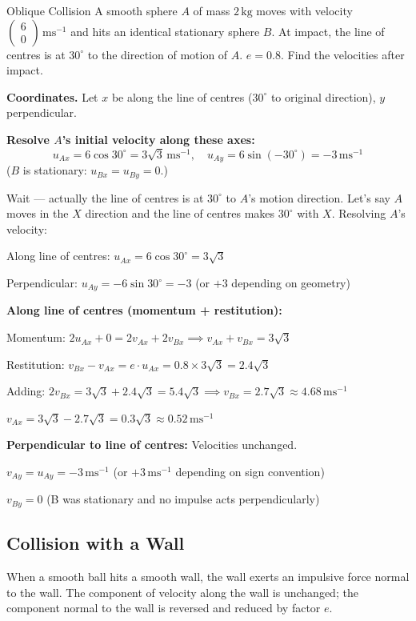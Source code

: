 \documentclass[12pt, a4paper]{book}
\newcommand{\ms}{\,\mathrm{ms}^{-1}}
\newcommand{\kg}{\,\mathrm{kg}}
\begin{document}
\begin{exmp}{Oblique Collision}{}
A smooth sphere $A$ of mass $2\kg$ moves with velocity $\begin{pmatrix}6 \\ 0\end{pmatrix}\ms$ and hits an identical stationary sphere $B$. At impact, the line of centres is at $30^\circ$ to the direction of motion of $A$. $e = 0.8$. Find the velocities after impact.

\medskip
\textbf{Coordinates.} Let $x$ be along the line of centres ($30^\circ$ to original direction), $y$ perpendicular.

\textbf{Resolve $A$'s initial velocity along these axes:}
\[
  u_{Ax} = 6\cos 30^\circ = 3\sqrt{3}\ms, \quad u_{Ay} = 6\sin(-30^\circ) = -3\ms
\]
($B$ is stationary: $u_{Bx} = u_{By} = 0$.)

Wait --- actually the line of centres is at $30^\circ$ to $A$'s motion direction. Let's say $A$ moves in the $X$ direction and the line of centres makes $30^\circ$ with $X$. Resolving $A$'s velocity:

Along line of centres: $u_{Ax} = 6\cos 30^\circ = 3\sqrt{3}$

Perpendicular: $u_{Ay} = -6\sin 30^\circ = -3$ (or $+3$ depending on geometry)

\textbf{Along line of centres (momentum + restitution):}

Momentum: $2u_{Ax} + 0 = 2v_{Ax} + 2v_{Bx} \implies v_{Ax} + v_{Bx} = 3\sqrt{3}$

Restitution: $v_{Bx} - v_{Ax} = e \cdot u_{Ax} = 0.8 \times 3\sqrt{3} = 2.4\sqrt{3}$

Adding: $2v_{Bx} = 3\sqrt{3} + 2.4\sqrt{3} = 5.4\sqrt{3} \implies v_{Bx} = 2.7\sqrt{3} \approx 4.68\ms$

$v_{Ax} = 3\sqrt{3} - 2.7\sqrt{3} = 0.3\sqrt{3} \approx 0.52\ms$

\textbf{Perpendicular to line of centres:} Velocities unchanged.

$v_{Ay} = u_{Ay} = -3\ms$ (or $+3\ms$ depending on sign convention)

$v_{By} = 0$ (B was stationary and no impulse acts perpendicularly)
\end{exmp}

\subsection{Collision with a Wall}

When a smooth ball hits a smooth wall, the wall exerts an impulsive force normal to the wall. The component of velocity along the wall is unchanged; the component normal to the wall is reversed and reduced by factor $e$.
\end{document}

